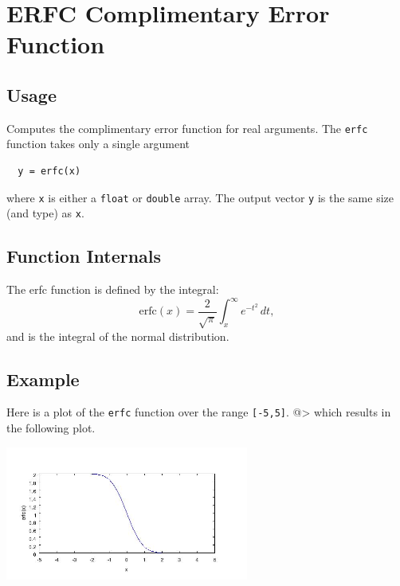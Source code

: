 \section{ERFC Complimentary Error Function}

\subsection{Usage}

Computes the complimentary error function for real arguments.  The \verb|erfc|
function takes only a single argument
\begin{verbatim}
  y = erfc(x)
\end{verbatim}
where \verb|x| is either a \verb|float| or \verb|double| array.  The output
vector \verb|y| is the same size (and type) as \verb|x|.
\subsection{Function Internals}

The erfc function is defined by the integral:
\[
  \mathrm{erfc}(x) = \frac{2}{\sqrt{\pi}}\int_{x}^{\infty} e^{-t^2} \, dt,
\]
and is the integral of the normal distribution.
\subsection{Example}

Here is a plot of the \verb|erfc| function over the range \verb|[-5,5]|.
@>
which results in the following plot.


\centerline{\includegraphics[width=8cm]{erfc1}}

